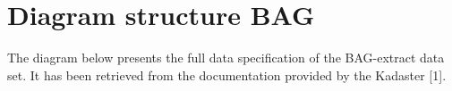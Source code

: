 \chapter{Diagram structure BAG}
The diagram below presents the full data specification of the BAG-extract data set. It has been retrieved from the documentation provided by the Kadaster [1]. 
